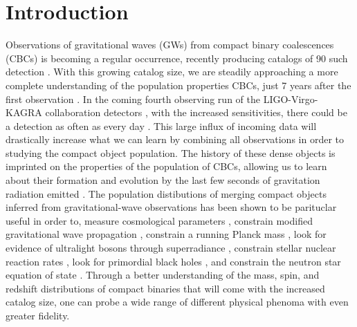 \section{Introduction} \label{sec:intro}

Observations of gravitational waves (GWs) from compact binary coalescences (CBCs) is becoming a regular occurrence, 
recently producing catalogs of 90 such detection \cite{GWTC1,gwtc2,GWTC3}. With this growing catalog size, we are steadily approaching a more complete  
understanding of the population properties CBCs, just 7 years after the first observation \cite{o1o2_pop,o3a_pop,o3b_astro_dist}. 
In the coming fourth observing run of the LIGO-Virgo-KAGRA collaboration detectors \citep{aLIGO,aVIRGO}, with the increased sensitivities, 
there could be a detection as often as every day \cite{LVK_prospects}. This large influx of incoming data will drastically increase what we can learn by combining all observations
in order to studying the compact object population. The history of these dense objects is imprinted on the properties of the population 
of CBCs, allowing us to learn about their formation and evolution by the last few seconds of gravitation radiation emitted \citep{Zevin_2017}. The population distibutions 
of merging compact objects inferred from gravitational-wave observations has been shown to be parituclar useful in order to, measure cosmological parameters \citep{Farr_2019HUB,gwtc3_cosmo}, 
constrain modified gravitational wave propagation \citep{ModGWProp,ModGWProp2}, constrain a running Planck mass \citep{Lagos_runningPlanckMass}, look for evidence of ultralight bosons through superradiance \citep{Ng_Boson2021,GWTC2_superradiance_Ng}, 
constrain stellar nuclear reaction rates \citep{Farmer_2019,Farmer_2020}, look for primordial black holes \citep{Ng_2021,KenNgPBH2022}, and constrain the neutron star equation of state \citep{Golomb_EOS}. 
Through a better understanding of the mass, spin, and redshift distributions of compact binaries that will come with the increased catalog size, 
one can probe a wide range of different physical phenoma with even greater fidelity.

